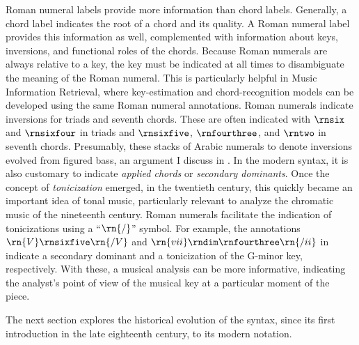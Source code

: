 Roman numeral labels provide more information than chord
labels. Generally, a chord label indicates the root of a
chord and its quality. A Roman numeral label provides this
information as well, complemented with information about
keys, inversions, and functional roles of the chords.
Because Roman numerals are always relative to a key, the key
must be indicated at all times to disambiguate the meaning
of the Roman numeral. This is particularly helpful in Music
Information Retrieval, where key-estimation and
chord-recognition models can be developed using the same
Roman numeral annotations. Roman numerals indicate
inversions for triads and seventh chords. These are often
indicated with $\rnsix$ and $\rnsixfour$ in triads and
$\rnsixfive$, $\rnfourthree$, and $\rntwo$ in seventh
chords. Presumably, these stacks of Arabic numerals to
denote inversions evolved from figured bass, an argument I
discuss in . In
the modern syntax, it is also customary to indicate
\emph{applied chords} or \emph{secondary dominants}. Once
the concept of \emph{tonicization} emerged, in the twentieth
century, this quickly became an important idea of tonal
music, particularly relevant to analyze the chromatic music
of the nineteenth century. Roman numerals facilitate the
indication of tonicizations using a ``$\rn{/}$'' symbol. For
example, the annotations $\rn{V}\rnsixfive\rn{/V}$ and
$\rn{vii}\rndim\rnfourthree\rn{/ii}$ in 
indicate a secondary dominant and a tonicization of the
G-minor key, respectively. With these, a musical analysis
can be more informative, indicating the analyst's point of
view of the musical key at a particular moment of the piece.

The next section explores the historical evolution of the
syntax, since its first introduction in the late eighteenth
century, to its modern notation.

